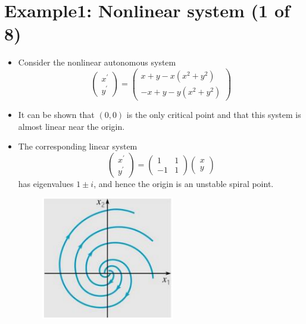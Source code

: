 \documentclass[11pt,a4paper]{article}
\begin{document}
	\section*{Example1: Nonlinear system (1 of 8)}
	\begin{itemize}
		\item Consider the nonlinear autonomous system
		$$
		\begin{pmatrix}
			x^\prime\\
			y^\prime
		\end{pmatrix}=
		\begin{pmatrix}
			x+y-x(x^2+y^2)\\
			-x+y-y(x^2+y^2)
		\end{pmatrix}
		$$
		\item It can be shown that $(0, 0)$ is the only critical point and that this system is almost linear near the origin.
		\item The corresponding linear system
		$$
		\begin{pmatrix}
			x^\prime\\
			y^\prime
		\end{pmatrix}=
		\begin{pmatrix}
			1 & 1\\
			-1 & 1
		\end{pmatrix}
		\begin{pmatrix}
			x\\
			y
		\end{pmatrix}
		$$
		has eigenvalues $1 \pm i$, and hence the origin is an unstable spiral point.
		\begin{figure}[H]
			\centering
			\includegraphics[width=0.55\textwidth]{figure/Lec19f2.PNG}
		\end{figure}
	\end{itemize}
\end{document}
